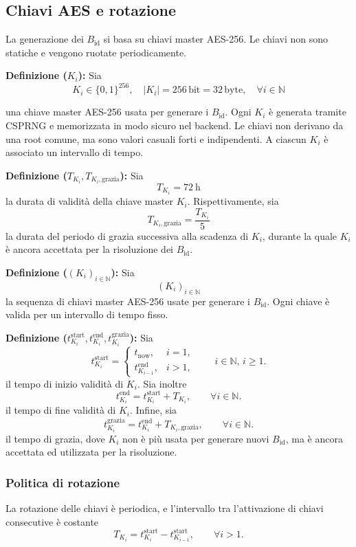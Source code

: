 \documentclass[a4paper,11pt]{article}
\begin{document}
\subsection{Chiavi AES e rotazione}
La generazione dei \(B_{\text{id}}\) si basa su chiavi master AES-256. Le chiavi non sono statiche e vengono ruotate periodicamente.


\textbf{Definizione (\(K_i\)):} Sia
\[
  K_i \in \{0,1\}^{256}, \quad |K_i| = 256 \,\text{bit} = 32 \,\text{byte}, \quad \forall i \in \mathbb{N}
\]

una chiave master AES-256 usata per generare i \(B_{\text{id}}\).
Ogni $K_i$ è generata tramite CSPRNG e memorizzata in modo sicuro nel backend. Le chiavi non derivano da una root comune, ma sono valori casuali forti e indipendenti.
A ciascun $K_i$ è associato un intervallo di tempo.

\textbf{Definizione (\(T_{K_i}, T_{K_i,\mathrm{grazia}}\)):} Sia
\[
  T_{K_i} = \SI{72}{\hour}
\]
la durata di validità della chiave master \(K_i\). Rispettivamente, sia
\[
  T_{K_i,\mathrm{grazia}} = \frac{T_{K_i}}{5}
\]
la durata del periodo di grazia successiva alla scadenza di \(K_i\), durante la quale \(K_i\) è ancora accettata per la risoluzione dei \(B_{\text{id}}\).


\textbf{Definizione (\((K_i)_{i\in\mathbb{N}}\)):} Sia
\[
  (K_i)_{i\in\mathbb{N}}
\]
la sequenza di chiavi master AES-256 usate per generare i \(B_{\text{id}}\). Ogni chiave è valida per un intervallo di tempo fisso.

\textbf{Definizione (\(t_{K_i}^{\text{start}}, t_{K_i}^{\text{end}}, t_{K_i}^{\text{grazia}}\)):} Sia
\[
  t_{K_i}^{\text{start}} =
  \begin{cases}
    t_{\text{now}},           & i = 1, \\
    t_{K_{i-1}}^{\text{end}}, & i > 1,
  \end{cases}
  \qquad i \in \mathbb{N},\, i \ge 1.
\]
il tempo di inizio validità di \(K_i\). Sia inoltre
\[
  t_{K_i}^{\text{end}} = t_{K_i}^{\text{start}} + T_{K_i}, \qquad \forall i \in \mathbb{N}.
\]
il tempo di fine validità di \(K_i\). Infine, sia
\[
  t_{K_i}^{\text{grazia}} = t_{K_i}^{\text{end}} + T_{K_i,\mathrm{grazia}}, \qquad \forall i \in \mathbb{N}.
\]
il tempo di grazia, dove \(K_i\) non è più usata per generare nuovi \(B_{\text{id}}\), ma è ancora accettata ed utilizzata per la risoluzione.

\subsubsection{Politica di rotazione}
La rotazione delle chiavi è periodica, e l'intervallo tra l'attivazione di chiavi consecutive è costante
\[
  T_{K_i} = t_{K_i}^{\text{start}} - t_{K_{i-1}}^{\text{start}}, \qquad \forall i > 1.
\]
\end{document}
